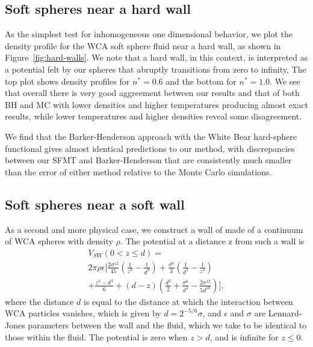 \documentclass[letterpaper,twocolumn,amsmath,amssymb,prb]{revtex4-1}
\begin{document}


\subsection{Soft spheres near a hard wall}

As the simplest test for inhomogeneous one dimensional
behavior, we plot the density profile for the WCA soft sphere
fluid near a hard wall, as shown in Figure~\ref{fig:hard-walls}. 
We note that a hard wall, in this context, is
interpreted as a potential felt by our spheres that abruptly
transitions from zero to infinity, 
%
%
%
%
The top plot shows density
profiles for $n^*=0.6$ and the bottom for $n^*=1.0$. We see that 
overall there is very good aggreement between our results and that of both BH and MC
with
lower densities and higher temperatures producing almost exact results, while
lower temperatures and higher densities reveal some disagreement.

We find that the Barker-Henderson approach with the White Bear
hard-sphere functional gives almost identical predictions to our
method, with discrepancies between our SFMT and Barker-Henderson that
are consistently much smaller than the error of either method relative
to the Monte Carlo simulations.

\subsection{Soft spheres near a soft wall}

As a second and more physical case, we construct a wall of made of a
continuum of WCA spheres with density $\rho$.  The potential
at a distance z from such a wall is
\begin{multline}
  V_{SW}(0 < z \leq d) = \\
  2\pi\rho\epsilon\Big[
  \frac{2\sigma^{12}}{45} \left(\frac{1}{z^9}-\frac{1}{d^9}\right)
  +\frac{\sigma^6}{3}\left(\frac{1}{d^3}-\frac{1}{z^3}
  \right) \\
  + \frac{z^3-d^3}{6} + \left( d - z \right)\left(\frac{d^2}{2} +
  \frac{\sigma^6}{d^4} - \frac{2\sigma^{12}}{5d^{10}}\right)
  \Bigg],
\label{eq:soft-wall-potential}
\end{multline}
where the distance $d$ is equal to the distance at which the
interaction between WCA particles vanishes, which is given by $d =
2^{-5/6}\sigma$, and $\epsilon$ and $\sigma$ are Lennard-Jones
parameters between the wall and the fluid, which we take to be
identical to those within the fluid. The potential is zero when $z>d$,
and is infinite for $z\leq 0$.
\end{document}

